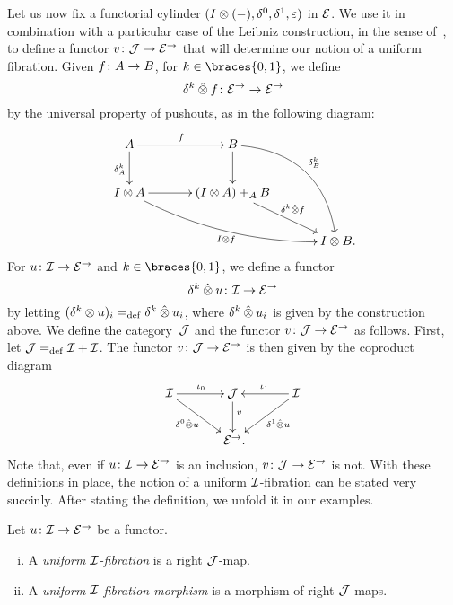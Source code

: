 \documentclass[reqno,10pt,a4paper,oneside,draft]{amsart}
\begin{document}
Let us now fix a functorial cylinder $(\interval \otimes (-), \lcyl, \rcyl, \ccyl)$ in $\calE$.
We use it in combination with a particular case of the Leibniz construction, in the sense of~\cite{riehl-verity:reedy}, to define a functor $v \co \cal{J} \to \catE^\to$ that will determine our notion of a uniform fibration.
Given $f \co A \to B$, for $k \in \braces{0, 1}$, we define
\[
  \delta^k \hatotimes f \co \catE^\to \to \catE^\to
\]
by the universal property of pushouts, as in the following diagram:
\begin{gather*}
\xymatrix@C=1.2cm{
  A \ar[r]^{f} \ar[d]_{\kcyl_{A}} & B \ar@/^2pc/[ddr]^{\kcyl_{B}} \ar[d] & \\
  \interval \otimes A \ar@/_1pc/[drr]_{\interval \otimes f} \ar[r] & (\interval \otimes A) +_{A} B \ar[dr]^-{\delta^k \hatotimes f} & \\
  & & \interval \otimes B
\rlap{.}}
\end{gather*}
For $u \co \cal{I} \to \catE^\to$ and $k \in \braces{0, 1}$, we define a functor
\[
  \kcyl \hatotimes u \co \cal{I} \to \catE^\to
\]
by letting $(\kcyl \otimes u)_i \defeq \kcyl \hatotimes u_i$, where $\kcyl \hatotimes u_i$ is given by the construction above.
We define the category~$\cal{J}$ and the functor $v \co \cal{J} \to \catE^\to$ as follows.
First, let $\cal{J} \defeq \cal{I} + \cal{I}$.
The functor $v \co \cal{J} \to \catE^\to$ is then given by the coproduct diagram
\begin{equation*}
\xymatrix@C=1.2cm{
  \cal{I} \ar[r]^{\iota_0} \ar[dr]_-{\lcyl \hatotimes u} & \cal{J} \ar[d]^(.4){v} & \cal{I} \ar[dl]^-{\rcyl \hatotimes u} \ar[l]_{\iota_1} \\
  & \catE^\to
\rlap{.}}
\end{equation*}
Note that, even if $u \co \cal{I} \to \catE^\to$ is an inclusion, $v \co \cal{J} \to \catE^\to$ is not. With these definitions
in place, the notion of a uniform $\cal{I}$-fibration can be stated very succinly. After stating the definition, we unfold
it in our examples.

\begin{definition} \label{def:I-fibration}
Let $u \co \cal{I} \to \catE^\to$ be a functor.
\begin{enumerate}[(i)]
\item A \emph{uniform $\cal{I}$-fibration} is a right $\cal{J}$-map.
\item A \emph{uniform $\cal{I}$-fibration morphism} is a morphism of right $\cal{J}$-maps.
\end{enumerate}
\end{definition}
\end{document}
